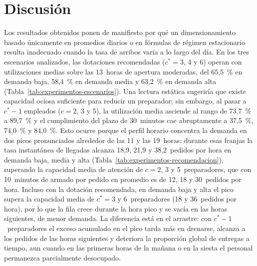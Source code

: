 \section{Discusión}
\label{sec:discusion}

Los resultados obtenidos ponen de manifiesto por qué un dimensionamiento basado únicamente en promedios diarios o en fórmulas de régimen estacionario resulta inadecuado cuando la tasa de arribos varía a lo largo del día.
En los tres escenarios analizados, las dotaciones recomendadas ($c^* = 3$, 4 y 6) operan con utilizaciones medias sobre las 13~horas de apertura moderadas, del 65,5~\% en demanda baja, 58,4~\% en demanda media y 63,2~\% en demanda alta (Tabla~\ref{tab:experimentos-escenarios}).
Una lectura estática sugeriría que existe capacidad ociosa suficiente para reducir un preparador; sin embargo, al pasar a $c^* - 1$ empleados ($c = 2$, 3 y 5), la utilización media asciende al rango de 73,7~\% a 89,7~\% y el cumplimiento del plazo de 30~minutos cae abruptamente a 37,5~\%, 74,0~\% y 84,0~\%.
Esto ocurre porque el perfil horario concentra la demanda en dos picos pronunciados alrededor de las 11 y las 19~horas: durante esas franjas la tasa instantánea de llegadas alcanza 18,9, 21,9 y 38,2~pedidos por hora en demanda baja, media y alta (Tabla~\ref{tab:experimentos-recomendacion}), superando la capacidad media de atención de $c = 2$, 3 y 5~preparadores, que con 10~minutos de armado por pedido en promedio es de 12, 18 y 30~pedidos por hora.
Incluso con la dotación recomendada, en demanda baja y alta el pico supera la capacidad media de $c^* = 3$ y 6~preparadores (18 y 36~pedidos por hora), por lo que la fila crece durante la hora pico y se vacía en las horas siguientes, de menor demanda.
La diferencia está en el arrastre: con $c^* - 1$~preparadores el exceso acumulado en el pico tarda más en drenarse, alcanza a los pedidos de las horas siguientes y deteriora la proporción global de entregas a tiempo, aun cuando en las primeras horas de la mañana o en la siesta el personal permanezca parcialmente desocupado.


